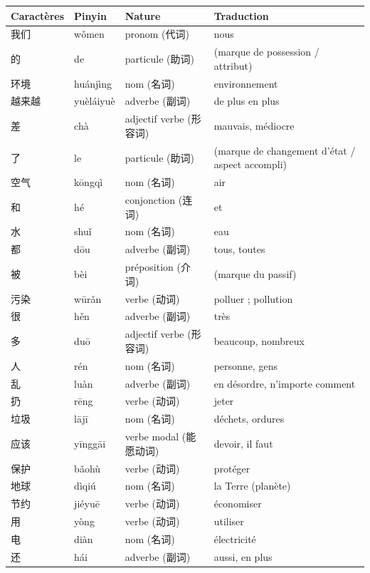 \documentclass[11pt]{article}
\begin{document}
\begin{center}
\begin{tabularx}{\linewidth}{|X|X|X|X|}
\hline
\rowcolor{popblueL} Caractères & Pinyin & Nature & Traduction \\
\hline
我们 & wǒmen & pronom (代词) & nous \\
\hline
的 & de & particule (助词) & (marque de possession / attribut) \\
\hline
环境 & huánjìng & nom (名词) & environnement \\
\hline
越来越 & yuèláiyuè & adverbe (副词) & de plus en plus \\
\hline
差 & chà & adjectif verbe (形容词) & mauvais, médiocre \\
\hline
了 & le & particule (助词) & (marque de changement d'état / aspect accompli) \\
\hline
空气 & kōngqì & nom (名词) & air \\
\hline
和 & hé & conjonction (连词) & et \\
\hline
水 & shuǐ & nom (名词) & eau \\
\hline
都 & dōu & adverbe (副词) & tous, toutes \\
\hline
被 & bèi & préposition (介词) & (marque du passif) \\
\hline
污染 & wūrǎn & verbe (动词) & polluer ; pollution \\
\hline
很 & hěn & adverbe (副词) & très \\
\hline
多 & duō & adjectif verbe (形容词) & beaucoup, nombreux \\
\hline
人 & rén & nom (名词) & personne, gens \\
\hline
乱 & luàn & adverbe (副词) & en désordre, n'importe comment \\
\hline
扔 & rēng & verbe (动词) & jeter \\
\hline
垃圾 & lājī & nom (名词) & déchets, ordures \\
\hline
应该 & yīnggāi & verbe modal (能愿动词) & devoir, il faut \\
\hline
保护 & bǎohù & verbe (动词) & protéger \\
\hline
地球 & dìqiú & nom (名词) & la Terre (planète) \\
\hline
节约 & jiéyuē & verbe (动词) & économiser \\
\hline
用 & yòng & verbe (动词) & utiliser \\
\hline
电 & diàn & nom (名词) & électricité \\
\hline
还 & hái & adverbe (副词) & aussi, en plus \\

\end{tabularx}
\end{center}
\end{document}
